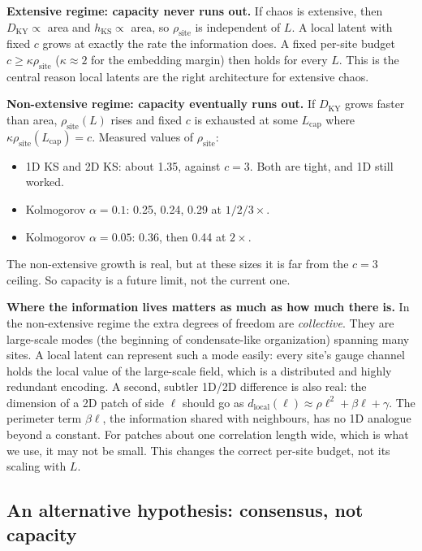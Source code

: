 \documentclass[11pt]{article}
\begin{document}
\textbf{Extensive regime: capacity never runs out.} If chaos is
extensive, then $D_{\mathrm{KY}}\propto$ area and
$h_{\mathrm{KS}}\propto$ area, so $\rho_{\mathrm{site}}$ is independent
of $L$. A local latent with fixed $c$ grows at exactly the rate the
information does. A fixed per-site budget $c\ge\kappa\rho_{\mathrm{site}}$
($\kappa\approx2$ for the embedding margin) then holds for every $L$. This
is the central reason local latents are the right architecture for
extensive chaos.

\textbf{Non-extensive regime: capacity eventually runs out.} If
$D_{\mathrm{KY}}$ grows faster than area, $\rho_{\mathrm{site}}(L)$ rises
and fixed $c$ is exhausted at some $L_{\mathrm{cap}}$ where
$\kappa\rho_{\mathrm{site}}(L_{\mathrm{cap}}) = c$. Measured values of
$\rho_{\mathrm{site}}$:
\begin{itemize}[leftmargin=*]
\item 1D KS and 2D KS: about 1.35, against $c{=}3$. Both are tight, and
  1D still worked.
\item Kolmogorov $\alpha{=}0.1$: 0.25, 0.24, 0.29 at $1/2/3\times$.
\item Kolmogorov $\alpha{=}0.05$: 0.36, then 0.44 at $2\times$.
\end{itemize}
The non-extensive growth is real, but at these sizes it is far from the
$c{=}3$ ceiling. So capacity is a future limit, not the current one.

\textbf{Where the information lives matters as much as how much there is.}
In the non-extensive regime the extra degrees of freedom are
\emph{collective}. They are large-scale modes (the beginning of
condensate-like organization) spanning many sites. A local latent can
represent such a mode easily: every site's gauge channel holds the local
value of the large-scale field, which is a distributed and highly
redundant encoding. A second, subtler 1D/2D difference is also real: the
dimension of a 2D patch of side $\ell$ should go as
$d_{\mathrm{local}}(\ell)\approx\rho\ell^2+\beta\ell+\gamma$. The
perimeter term $\beta\ell$, the information shared with neighbours, has
no 1D analogue beyond a constant. For patches about one correlation
length wide, which is what we use, it may not be small. This changes the
correct per-site budget, not its scaling with $L$.

\subsection{An alternative hypothesis: consensus, not capacity}
\end{document}
